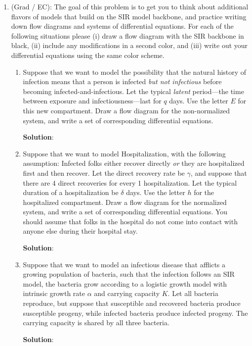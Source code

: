 \documentclass[11pt]{article}
\begin{document}
\begin{enumerate}
\clearpage
\item (Grad / EC): The goal of this problem is to get you to think about additional flavors of models that build on the SIR model backbone, and practice writing down flow diagrams and systems of differential equations. For each of the following situations please (i) draw a flow diagram with the SIR backbone in black, (ii) include any modifications in a second color, and (iii) write out your differential equations using the same color scheme. 
\begin{enumerate}
	\item Suppose that we want to model the possibility that the natural history of infection means that a person is infected {\it but not infectious} before becoming infected-and-infectious. Let the typical {\it latent} period---the time between exposure and infectiousness---last for $q$ days. Use the letter $E$ for this new compartment. Draw a flow diagram for the non-normalized system, and write a set of corresponding differential equations. 
	\begin{tcolorbox}
		\textbf{Solution}:
	\end{tcolorbox}
	\item Suppose that we want to model Hospitalization, with the following assumption: Infected folks either recover directly {\it or} they are hospitalized first and then recover. Let the direct recovery rate be $\gamma$, and suppose that there are 4 direct recoveries for every 1 hospitalization. Let the typical duration of a hospitalization be $\delta$ days. Use the letter $h$ for the hospitalized compartment. Draw a flow diagram for the normalized system, and write a set of corresponding differential equations. You should assume that folks in the hospital do not come into contact with anyone else during their hospital stay.
	\begin{tcolorbox}
		\textbf{Solution}:
	\end{tcolorbox}
	\item Suppose that we want to model an infectious disease that afflicts a growing population of bacteria, such that the infection follows an SIR model, the bacteria grow according to a logistic growth model with intrinsic growth rate $\alpha$ and carrying capacity $K$. Let all bacteria reproduce, but suppose that susceptible and recovered bacteria produce susceptible progeny, while infected bacteria produce infected progeny. The carrying capacity is shared by all three bacteria. 
	\begin{tcolorbox}
		\textbf{Solution}:
	\end{tcolorbox}
\end{enumerate}

\end{enumerate}
\end{document}
